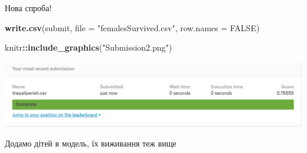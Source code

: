 \documentclass[ignorenonframetext,]{beamer}
\newenvironment{Shaded}{\begin{snugshade}}{\end{snugshade}}
\newcommand{\DataTypeTok}[1]{\textcolor[rgb]{0.13,0.29,0.53}{#1}}
\newcommand{\DecValTok}[1]{\textcolor[rgb]{0.00,0.00,0.81}{#1}}
\newcommand{\KeywordTok}[1]{\textcolor[rgb]{0.13,0.29,0.53}{\textbf{#1}}}
\newcommand{\NormalTok}[1]{#1}
\newcommand{\OperatorTok}[1]{\textcolor[rgb]{0.81,0.36,0.00}{\textbf{#1}}}
\newcommand{\OtherTok}[1]{\textcolor[rgb]{0.56,0.35,0.01}{#1}}
\newcommand{\StringTok}[1]{\textcolor[rgb]{0.31,0.60,0.02}{#1}}
\begin{document}
\begin{frame}[fragile]{Нова спроба!}
\protect\hypertarget{ux43dux43eux432ux430-ux441ux43fux440ux43eux431ux430}{}

\begin{Shaded}
\begin{Highlighting}[]
\KeywordTok{write.csv}\NormalTok{(submit, }\DataTypeTok{file =} \StringTok{"femalesSurvived.csv"}\NormalTok{, }\DataTypeTok{row.names =} \OtherTok{FALSE}\NormalTok{)}
\end{Highlighting}
\end{Shaded}

\begin{Shaded}
\begin{Highlighting}[]
\NormalTok{knitr}\OperatorTok{::}\KeywordTok{include_graphics}\NormalTok{(}\StringTok{"Submission2.png"}\NormalTok{)}
\end{Highlighting}
\end{Shaded}

\includegraphics[width=26.42in]{Submission2}

\end{frame}

\begin{frame}[fragile]{Додамо дітей в модель, їх виживання теж вище}
\protect\hypertarget{ux434ux43eux434ux430ux43cux43e-ux434ux456ux442ux435ux439-ux432-ux43cux43eux434ux435ux43bux44c-ux457ux445-ux432ux438ux436ux438ux432ux430ux43dux43dux44f-ux442ux435ux436-ux432ux438ux449ux435}{}

\begin{Shaded}
\end{Shaded}

\end{frame}
\end{document}
